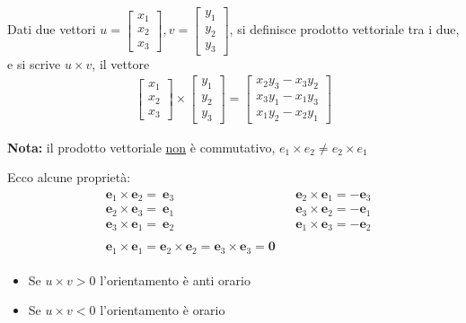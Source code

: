 \documentclass[../main.tex]{subfiles}
\begin{document}
Dati due vettori $u = \begin{bmatrix}x_1 \\ x_2 \\ x_3\end{bmatrix}, v=\begin{bmatrix}y_1 \\ y_2 \\ y_3 \end{bmatrix}$, si definisce prodotto vettoriale
tra i due, e si scrive $u\times v$, il vettore
\begin{align*}
    \begin{bmatrix}x_1 \\ x_2 \\ x_3\end{bmatrix} \times \begin{bmatrix}y_1 \\ y_2 \\ y_3 \end{bmatrix}
    = \begin{bmatrix} x_2y_3 - x_3y_2 \\ x_3y_1 - x_1y_3 \\ x_1y_2 - x_2y_1\end{bmatrix}
\end{align*}

\textbf{Nota:} il prodotto vettoriale \underline{non} è commutativo, $e_1 \times e_2 \neq e_2 \times e_1$

Ecco alcune proprietà:
\begin{align*}
    \begin{aligned}
        &\mathbf{e}_1\times\mathbf{e}_2=\mathbf{~e}_3&&\mathbf{e}_2\times\mathbf{e}_1=-\mathbf{e}_3\\
        &\mathbf{e}_2\times\mathbf{e}_3=\mathbf{~e}_1&&\mathbf{e}_3\times\mathbf{e}_2=-\mathbf{e}_1\\
        &\mathbf{e}_3\times\mathbf{e}_1=\mathbf{~e}_2&&\mathbf{e}_1\times\mathbf{e}_3=-\mathbf{e}_2\\ \\
        &\mathbf{e}_1\times\mathbf{e}_1=\mathbf{e}_2\times\mathbf{e}_2=\mathbf{e}_3\times\mathbf{e}_3=\mathbf{0}
    \end{aligned}
\end{align*}

\begin{itemize}
    \item Se $u\times v > 0$ l'orientamento è anti orario
    \item Se $u\times v < 0$ l'orientamento è orario
\end{itemize}
\end{document}
